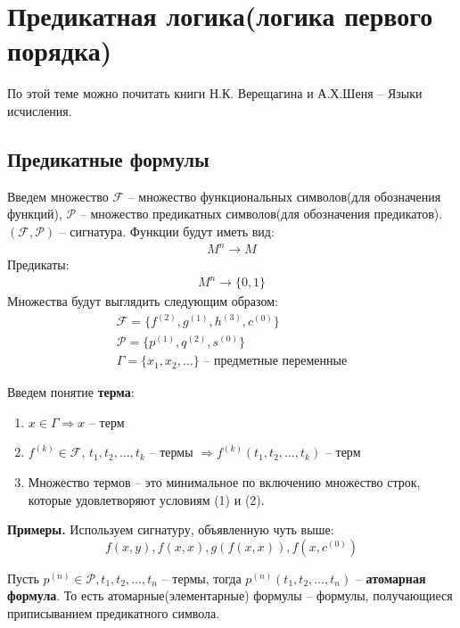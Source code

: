\section{Предикатная логика(логика первого порядка)}
По этой теме можно почитать книги Н.К. Верещагина и А.Х.Шеня -- Языки исчисления. 
\subsection{Предикатные формулы}
\begin{conj}
    Введем множество $\mathcal{F}$ -- множество функциональных символов(для обозначения функций), $\mathcal{P}$ -- множество предикатных символов(для обозначения предикатов).
    $(\mathcal{F}, \mathcal{P})$ -- сигнатура. 
    Функции будут иметь вид:
    \begin{gather*}
        M^n \longrightarrow M
    \end{gather*} 
    Предикаты:
    \begin{gather*}
        M^n \longrightarrow \{0, 1\} 
    \end{gather*}
    Множества будут выглядить следующим образом:
    \begin{gather*}
        \mathcal{F} = \{f^{(2)}, g^{(1)}, h^{(3)}, c^{(0)}\} \\
        \mathcal{P} = \{p^{(1)}, q^{(2 )}, s^{(0)}\} \\
        \Gamma = \{x_1, x_2, \dots\} \text{ -- предметные переменные}
    \end{gather*}
\end{conj}
\begin{conj}
    Введем понятие \textbf{терма}:
    \begin{enumerate}
        \item $x \in \Gamma \Longrightarrow x$ -- терм 
        \item $f^{(k)} \in \mathcal{F}$, $t_1, t_2, \dots, t_k$ -- термы $\Longrightarrow f^{(k)} (t_1, t_2, \dots, t_k)$ -- терм
        \item Множество термов -- это минимальное по включению множество строк, которые удовлетворяют условиям (1) и (2). 
    \end{enumerate}
\end{conj}

\textbf{Примеры.} Используем сигнатуру, объявленную чуть выше: \[ f(x, y), f(x, x), g(f(x, x)), f(x, c^{(0)}) \]

\vspace{3mm}

\begin{conj}
    Пусть $p^{(n)} \in \mathcal{P}, t_1, t_2, \dots, t_n$ -- термы, тогда 
    $p^{(n)} (t_1, t_2, \dots, t_n)$ -- \textbf{атомарная формула}. То есть атомарные(элементарные) формулы -- формулы, получающиеся
    приписыванием предикатного символа.  
\end{conj}

